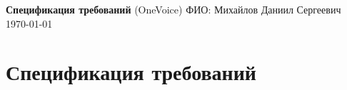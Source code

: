 \documentclass{G7-32}
\begin{document}
\frontmatter

\thispagestyle{empty}
\begin{center}
  \vspace*{2cm}
  {\fontsize{16pt}{24pt}\selectfont\bfseries Спецификация требований}
  \vspace{1cm}
  {\fontsize{12pt}{18pt}\selectfont (OneVoice)}
  \vspace{2cm}
  {\fontsize{14pt}{21pt}\selectfont ФИО: Михайлов Даниил Сергеевич}
  \vspace{1.5cm}
  {\fontsize{12pt}{18pt}\selectfont \today}
\end{center}
\clearpage

\chapter*{Спецификация требований}

\tableofcontents

\mainmatter







\appendix


\backmatter


\end{document}
